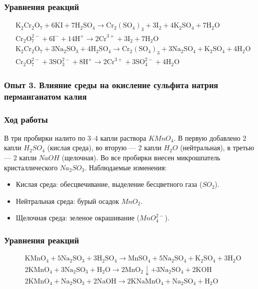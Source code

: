 \documentclass[a4paper,12pt]{article}
\begin{document}
	\subsubsection*{Уравнения реакций}
	\begin{align*}
		& \text{K}_2\text{Cr}_2\text{O}_7 + 6\text{KI} + 7\text{H}_2\text{SO}_4 \rightarrow \text{Cr}_2(\text{SO}_4)_3 + 3\text{I}_2 + 4\text{K}_2\text{SO}_4 + 7\text{H}_2\text{O} \\
		& \text{Cr}_2\text{O}_7^{2-} + 6\text{I}^- + 14\text{H}^+ \rightarrow 2\text{Cr}^{3+} + 3\text{I}_2 + 7\text{H}_2\text{O} \\
		& \text{K}_2\text{Cr}_2\text{O}_7 + 3\text{Na}_2\text{SO}_3 + 4\text{H}_2\text{SO}_4 \rightarrow \text{Cr}_2(\text{SO}_4)_3 + 3\text{Na}_2\text{SO}_4 + \text{K}_2\text{SO}_4 + 4\text{H}_2\text{O} \\
		& \text{Cr}_2\text{O}_7^{2-} + 3\text{SO}_3^{2-} + 8\text{H}^+ \rightarrow 2\text{Cr}^{3+} + 3\text{SO}_4^{2-} + 4\text{H}_2\text{O}
	\end{align*}
	
	\subsubsection*{Опыт 3. Влияние среды на окисление сульфита натрия перманганатом калия}
	
	\subsubsection*{Ход работы}
	
	\quad В три пробирки налито по 3–4 капли раствора \(KMnO_4\). В первую добавлено 2 капли \(H_2SO_4\) (кислая среда), во вторую — 2 капли \(H_2O\) (нейтральная), в третью — 2 капли \(NaOH\) (щелочная). Во все пробирки внесен микрошпатель кристаллического \(Na_2SO_3\). Наблюдаемые изменения:
	
	\begin{itemize}
		\item Кислая среда: обесцвечивание, выделение бесцветного газа (\(SO_2\)).
		\item Нейтральная среда: бурый осадок \(MnO_2\).
		\item Щелочная среда: зеленое окрашивание (\(MnO_4^{2-}\)).
	\end{itemize}
	
	\subsubsection*{Уравнения реакций}
	\begin{align*}
		& \text{KMnO}_4 + 5\text{Na}_2\text{SO}_3 + 3\text{H}_2\text{SO}_4 \rightarrow \text{MnSO}_4 + 5\text{Na}_2\text{SO}_4 + \text{K}_2\text{SO}_4 + 3\text{H}_2\text{O} \\
		& 2\text{KMnO}_4 + 3\text{Na}_2\text{SO}_3 + \text{H}_2\text{O} \rightarrow 2\text{MnO}_2 \downarrow + 3\text{Na}_2\text{SO}_4 + 2\text{KOH} \\
		& 2\text{KMnO}_4 + \text{Na}_2\text{SO}_3 + 2\text{NaOH} \rightarrow 2\text{KNaMnO}_4 + \text{Na}_2\text{SO}_4 + \text{H}_2\text{O}
	\end{align*}
	
\end{document}
